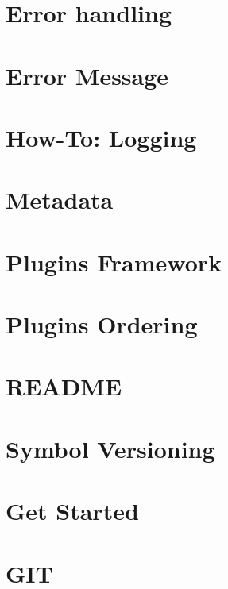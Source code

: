 \let\mypdfximage\pdfximage\def\pdfximage{\immediate\mypdfximage}\documentclass[twoside]{book}
\newcommand{\+}{\discretionary{\mbox{\scriptsize$\hookleftarrow$}}{}{}}
\begin{document}
\chapter{Error handling}
\label{doc_dev_error-handling_md}

\chapter{Error Message}
\label{doc_dev_error-message_md}

\chapter{How-\/\+To\+: Logging}
\label{doc_dev_logging_md}

\chapter{Metadata}
\label{doc_dev_metadata_md}

\chapter{Plugins Framework}
\label{doc_dev_plugins-framework_md}

\chapter{Plugins Ordering}
\label{doc_dev_plugins-ordering_md}

\chapter{R\+E\+A\+D\+ME}
\label{md_doc_dev_README}

\chapter{Symbol Versioning}
\label{doc_dev_symbol-versioning_md}

\chapter{Get Started}
\label{doc_GETSTARTED_md}

\chapter{G\+IT}
\label{doc_GIT_md}

\end{document}
